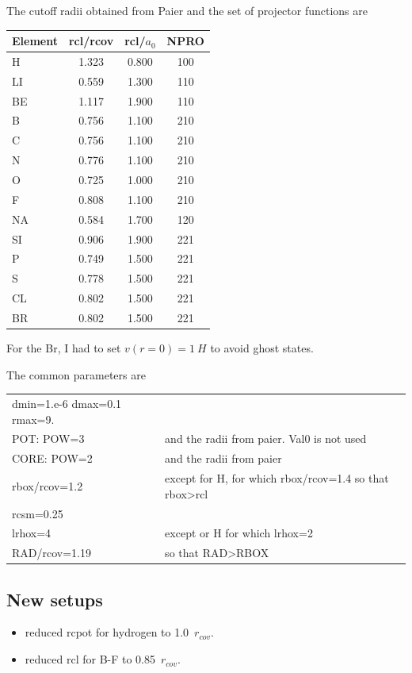\documentclass[11pt,a4paper]{report}
\begin{document}
The cutoff radii obtained from Paier and the set of projector functions are
\begin{center}
\begin{tabular}{|l|c|c|c|}
\hline
Element  & rcl/rcov & rcl/$a_0$ & NPRO\\
\hline                            
H        &  1.323  &   0.800  &  100\\
LI       &  0.559  &   1.300  &  110\\
BE       &  1.117  &   1.900  &  110\\
B        &  0.756  &   1.100  &  210\\
C        &  0.756  &   1.100  &  210\\
N        &  0.776  &   1.100  &  210\\
O        &  0.725  &   1.000  &  210\\
F        &  0.808  &   1.100  &  210\\
NA       &  0.584  &   1.700  &  120\\
SI       &  0.906  &   1.900  &  221\\
P        &  0.749  &   1.500  &  221\\
S        &  0.778  &   1.500  &  221\\
CL       &  0.802  &   1.500  &  221\\
BR       &  0.802  &   1.500  &  221\\
\hline
\end{tabular}
\end{center}
For the Br, I had to set $v(r=0)=1~H$ to avoid ghost states.

The common parameters are \\
\begin{tabular}{|l|l|}
\hline
dmin=1.e-6 dmax=0.1 rmax=9.&\\
POT:  POW=3   & and the radii from paier. Val0 is not used\\
CORE: POW=2   & and the radii from paier\\
rbox/rcov=1.2 & except for H, for which rbox/rcov=1.4 so that rbox>rcl\\
rcsm=0.25     & \\
lrhox=4       & except or H for which lrhox=2 \\
RAD/rcov=1.19 & so that RAD>RBOX\\
\hline
\end{tabular}

\subsection{New setups}
\begin{itemize}
\item reduced rcpot for hydrogen to 1.0~$r_{cov}$.
\item reduced rcl for B-F to 0.85~$r_{cov}$.
\end{itemize}
\end{document}
